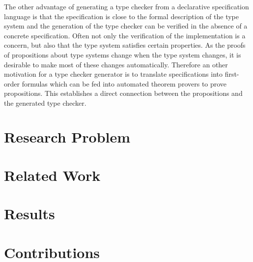 \documentclass{acm_proc_article-sp}
\begin{document}
The other advantage of generating a type checker from a declarative
specification language is that the specification is close to the
formal description of the type system and the generation of the type
checker can be verified in the absence of a concrete
specification. Often not only the verification of the implementation
is a concern, but also that the type system satisfies certain
properties. As the proofs of propositions about type systems change
when the type system changes, it is desirable to make most of these
changes automatically. Therefore an other motivation for a type
checker generator is to translate specifications into first-order
formulas which can be fed into automated theorem provers to prove
propositions. This establishes a direct connection between the
propositions and the generated type checker.
\section{Research Problem}
\section{Related Work}
\section{Results}
\section{Contributions}
\end{document}
